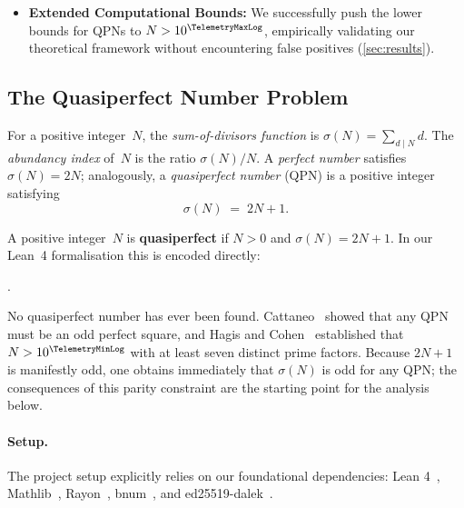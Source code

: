 \begin{itemize}
  \item \textbf{Extended Computational Bounds:}
    We successfully push the lower bounds for QPNs to $N > 10^{\TelemetryMaxLog}$,
    empirically validating our theoretical framework without
    encountering false positives (\cref{sec:results}).
\end{itemize}


\subsection{The Quasiperfect Number Problem}
\label{sec:qpn_problem}

For a positive integer~$N$, the \emph{sum-of-divisors function} is
$\sigma(N) = \sum_{d \mid N} d$.  The \emph{abundancy index} of~$N$ is
the ratio $\sigma(N)/N$.  A \emph{perfect number} satisfies
$\sigma(N)=2N$; analogously, a \emph{quasiperfect number} (QPN) is a
positive integer satisfying
%
\begin{equation}\label{eq:qpn-def}
  \sigma(N) \;=\; 2N + 1.
\end{equation}

\begin{definition}\label{def:qpn}
  A positive integer~$N$ is \textbf{quasiperfect} if $N > 0$ and
  $\sigma(N) = 2N + 1$.  In our Lean~4 formalisation this is encoded
  directly:
  \begin{center}
    .
  \end{center}
\end{definition}

No quasiperfect number has ever been found.  Cattaneo~\cite{cattaneo1951}
showed that any QPN must be an odd perfect square, and Hagis and
Cohen~\cite{hagis1982} established that $N > 10^{\TelemetryMinLog}$ with at least
seven distinct prime factors.  Because $2N+1$ is manifestly odd, one
obtains immediately that $\sigma(N)$ is odd for any QPN; the
consequences of this parity constraint are the starting point for the
analysis below.

\paragraph{Setup.}
The project setup explicitly relies on our foundational dependencies: Lean 4~\cite{moura2021}, Mathlib~\cite{mathlib2020}, Rayon~\cite{rayon2024}, bnum~\cite{bnum2024}, and ed25519-dalek~\cite{ed25519dalek2024}.

